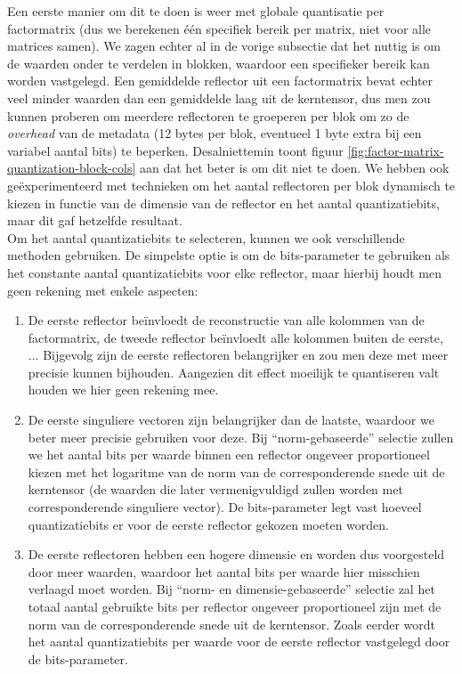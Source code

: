 Een eerste manier om dit te doen is weer met globale quantisatie per factormatrix (dus we berekenen \'e\'en specifiek bereik per matrix, niet voor alle matrices samen). We zagen echter al in de vorige subsectie dat het nuttig is om de waarden onder te verdelen in blokken, waardoor een specifieker bereik kan worden vastgelegd. Een gemiddelde reflector uit een factormatrix bevat echter veel minder waarden dan een gemiddelde laag uit de kerntensor, dus men zou kunnen proberen om meerdere reflectoren te groeperen per blok om zo de \textit{overhead} van de metadata (12 bytes per blok, eventueel 1 byte extra bij een variabel aantal bits) te beperken. Desalniettemin toont figuur \ref{fig:factor-matrix-quantization-block-cols} aan dat het beter is om dit niet te doen. We hebben ook ge\"experimenteerd met technieken om het aantal reflectoren per blok dynamisch te kiezen in functie van de dimensie van de reflector en het aantal quantizatiebits, maar dit gaf hetzelfde resultaat.\\

Om het aantal quantizatiebits te selecteren, kunnen we ook verschillende methoden gebruiken. De simpelste optie is om de bits-parameter te gebruiken als het constante aantal quantizatiebits voor elke reflector, maar hierbij houdt men geen rekening met enkele aspecten:

\begin{enumerate}

\item De eerste reflector be\"invloedt de reconstructie van alle kolommen van de factormatrix, de tweede reflector be\"invloedt alle kolommen buiten de eerste, ... Bijgevolg zijn de eerste reflectoren belangrijker en zou men deze met meer precisie kunnen bijhouden. Aangezien dit effect moeilijk te quantiseren valt houden we hier geen rekening mee.

\item De eerste singuliere vectoren zijn belangrijker dan de laatste, waardoor we beter meer precisie gebruiken voor deze. Bij ``norm-gebaseerde'' selectie zullen we het aantal bits per waarde binnen een reflector ongeveer proportioneel kiezen met het logaritme van de norm van de corresponderende snede uit de kerntensor (de waarden die later vermenigvuldigd zullen worden met corresponderende singuliere vector). De bits-parameter legt vast hoeveel quantizatiebits er voor de eerste reflector gekozen moeten worden.

\item De eerste reflectoren hebben een hogere dimensie en worden dus voorgesteld door meer waarden, waardoor het aantal bits per waarde hier misschien verlaagd moet worden. Bij ``norm- en dimensie-gebaseerde'' selectie zal het totaal aantal gebruikte bits per reflector ongeveer proportioneel zijn met de norm van de corresponderende snede uit de kerntensor. Zoals eerder wordt het aantal quantizatiebits per waarde voor de eerste reflector vastgelegd door de bits-parameter.

\end{enumerate}

